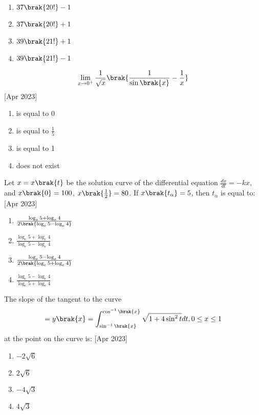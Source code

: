 \begin{enumerate}
     \item $37 \brak{20!} - 1$
     \item $37 \brak{20!} + 1$
     \item $39 \brak{21!} + 1$
     \item $39 \brak{21!} - 1$ \\
 \end{enumerate}
\item \begin{align*}
    \lim\limits_{x \rightarrow 0^{+}}\frac{1}{\sqrt{x}}\brak{\frac{1}{\sin\brak{x}} - \frac{1}{x}}
\end{align*} \hfill[Apr 2023]
\begin{enumerate}
    \item is equal to 0
    \item is equal to $\frac{1}{5}$
    \item is equal to 1
    \item does not exist \\
\end{enumerate}
\item  Let $x = x\brak{t}$ be the solution curve of the differential equation $\frac{dx}{dt} = -kx$, and $x\brak{0} = 100$, $x\brak{\frac{1}{2}} = 80$. If $x\brak{t_{\alpha}} = 5$, then $t_{\alpha}$ is equal to: \hfill[Apr 2023]
\begin{enumerate}
    \item $\frac{\log_{e}5 + \log_{e}4}{2\brak{\log_{e}5 - \log_{e}4}}$
    \item $\frac{\log_{e}5 + \log_{e}4}{\log_{e}5 - \log_{e}4}$
    \item $\frac{\log_{e}5 - \log_{e}4}{2\brak{\log_{e}5 + \log_{e}4}}$
    \item $\frac{\log_{e}5 - \log_{e}4}{\log_{e}5 + \log_{e}4}$ \\
\end{enumerate}
\item The slope of the tangent to the curve
\begin{align*}
  = y\brak{x} = \int_{\sin^{-1}\brak{x}}^{\cos^{-1}\brak{x}}\sqrt{1 + 4\sin^2t}dt, 0 \leq x \leq 1
\end{align*}
at the point  on the curve is: \hfill[Apr 2023]
\begin{enumerate}
    \item $-2\sqrt{6}$
    \item $2\sqrt{6}$
    \item $-4\sqrt{3}$
    \item $4\sqrt{3}$\\
\end{enumerate}
